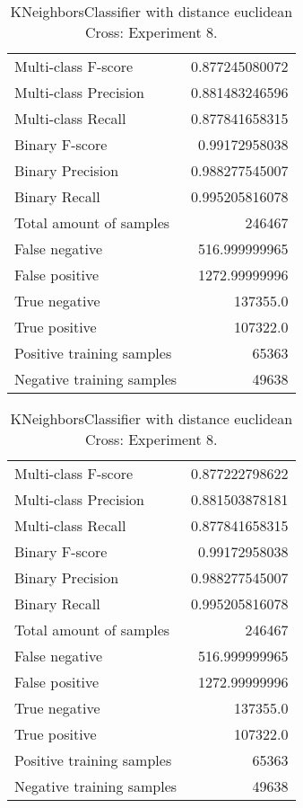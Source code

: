 \begin{table}[H]
\begin{minipage}{0.5\textwidth}
\caption{KNeighborsClassifier with distance euclidean Cross: Experiment 7.}
\centering
\begin{tabular}{l r}
\toprule
Multi-class F-score & 0.877245080072 \\
Multi-class Precision & 0.881483246596 \\
Multi-class Recall & 0.877841658315 \\
\midrule
Binary F-score & 0.99172958038 \\
Binary Precision & 0.988277545007 \\
Binary Recall & 0.995205816078 \\
\midrule
Total amount of samples & 246467 \\
False negative & 516.999999965 \\
False positive & 1272.99999996 \\
True negative & 137355.0 \\
True positive & 107322.0 \\
\midrule
Positive training samples & 65363 \\
Negative training samples & 49638 \\
\bottomrule
\end{tabular}
\end{minipage}
\hfillx
\begin{minipage}{0.5\textwidth}
\caption{KNeighborsClassifier with distance euclidean Cross: Experiment 8.}
\centering
\begin{tabular}{l r}
\toprule
Multi-class F-score & 0.877222798622 \\
Multi-class Precision & 0.881503878181 \\
Multi-class Recall & 0.877841658315 \\
\midrule
Binary F-score & 0.99172958038 \\
Binary Precision & 0.988277545007 \\
Binary Recall & 0.995205816078 \\
\midrule
Total amount of samples & 246467 \\
False negative & 516.999999965 \\
False positive & 1272.99999996 \\
True negative & 137355.0 \\
True positive & 107322.0 \\
\midrule
Positive training samples & 65363 \\
Negative training samples & 49638 \\
\bottomrule
\end{tabular}
\end{minipage}
\end{table}
